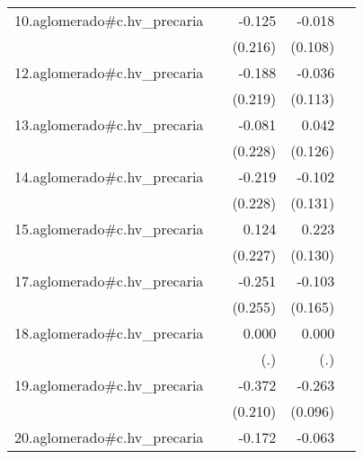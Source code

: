 {\begin{longtable}{l*{4}{D{.}{.}{-1}}}
\addlinespace
10.aglomerado#c.hv\_precaria&                     &      -0.125         &      -0.018         &                     \\
            &                     &     (0.216)         &     (0.108)         &                     \\
\addlinespace
12.aglomerado#c.hv\_precaria&                     &      -0.188         &      -0.036         &                     \\
            &                     &     (0.219)         &     (0.113)         &                     \\
\addlinespace
13.aglomerado#c.hv\_precaria&                     &      -0.081         &       0.042         &                     \\
            &                     &     (0.228)         &     (0.126)         &                     \\
\addlinespace
14.aglomerado#c.hv\_precaria&                     &      -0.219         &      -0.102         &                     \\
            &                     &     (0.228)         &     (0.131)         &                     \\
\addlinespace
15.aglomerado#c.hv\_precaria&                     &       0.124         &       0.223         &                     \\
            &                     &     (0.227)         &     (0.130)         &                     \\
\addlinespace
17.aglomerado#c.hv\_precaria&                     &      -0.251         &      -0.103         &                     \\
            &                     &     (0.255)         &     (0.165)         &                     \\
\addlinespace
18.aglomerado#c.hv\_precaria&                     &       0.000         &       0.000         &                     \\
            &                     &         (.)         &         (.)         &                     \\
\addlinespace
19.aglomerado#c.hv\_precaria&                     &      -0.372         &      -0.263\sym{**} &                     \\
            &                     &     (0.210)         &     (0.096)         &                     \\
\addlinespace
20.aglomerado#c.hv\_precaria&                     &      -0.172         &      -0.063         &                     \\

\end{longtable}}
